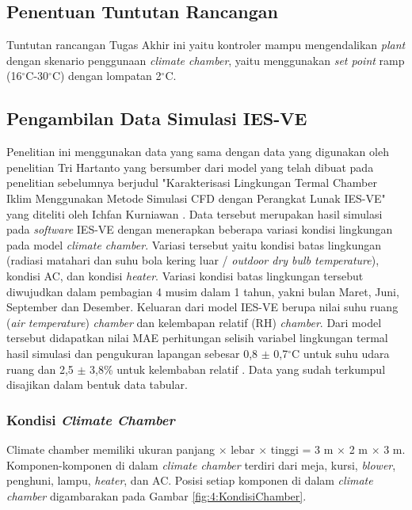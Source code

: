 \documentclass[a4paper,10pt]{article}
\newenvironment{body}{\begin{multicols}{2}}{\end{multicols}}
\begin{document}
\begin{body}
		\subsection{Penentuan Tuntutan Rancangan}
		
		Tuntutan rancangan Tugas Akhir ini yaitu kontroler mampu mengendalikan \textit{plant} dengan skenario penggunaan \textit{climate chamber}, yaitu menggunakan \textit{set point} ramp (16$^{\circ}$C-30$^{\circ}$C) dengan lompatan 2$^{\circ}$C.
		
		\subsection{Pengambilan Data Simulasi IES-VE}\label{subsec:lang_bench}
		Penelitian ini menggunakan data yang sama dengan data yang digunakan oleh penelitian Tri Hartanto\cite{skripsiTanto} yang bersumber dari model yang telah dibuat pada penelitian sebelumnya berjudul "Karakterisasi Lingkungan Termal Chamber Iklim Menggunakan Metode Simulasi CFD dengan Perangkat Lunak IES-VE" yang diteliti oleh Ichfan Kurniawan \cite{skripsiIchfan}.  Data tersebut merupakan hasil simulasi pada \textit{software} IES-VE dengan menerapkan beberapa variasi kondisi lingkungan pada model \textit{climate chamber}. Variasi tersebut yaitu kondisi batas lingkungan (radiasi matahari dan suhu bola kering luar / \textit{outdoor dry bulb temperature}), kondisi AC, dan kondisi \textit{heater}. Variasi kondisi batas lingkungan tersebut diwujudkan dalam pembagian 4 musim dalam 1 tahun, yakni bulan Maret, Juni, September dan Desember. Keluaran dari model IES-VE berupa nilai suhu ruang (\textit{air temperature}) \textit{chamber} dan kelembapan relatif (RH) \textit{chamber}. Dari model tersebut didapatkan nilai MAE perhitungan selisih variabel lingkungan termal hasil simulasi dan pengukuran lapangan sebesar 0,8 $\pm$ 0,7$^{\circ}$C untuk suhu udara ruang dan 2,5 $\pm$ 3,8\% untuk kelembaban relatif \cite{skripsiIchfan}. Data yang sudah terkumpul disajikan dalam bentuk data tabular.
		
		\subsubsection{Kondisi \textit{Climate Chamber}}
		
		Climate chamber memiliki ukuran panjang $\times$ lebar $\times$ tinggi = 3 m $\times$ 2 m $\times$ 3 m. Komponen-komponen di dalam \textit{climate chamber} terdiri dari meja, kursi, \textit{blower}, penghuni, lampu, \textit{heater}, dan AC. Posisi setiap komponen di dalam \textit{climate chamber} digambarakan pada Gambar \ref{fig:4:KondisiChamber}.\\
		

\end{body}
\end{document}
